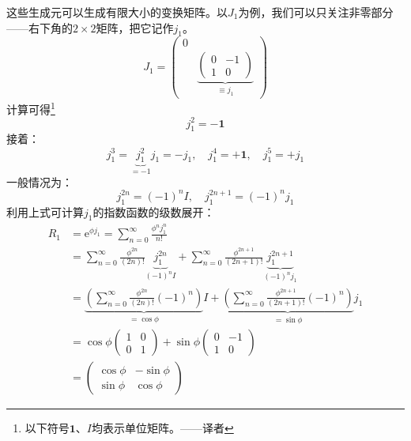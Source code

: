 这些生成元可以生成有限大小的变换矩阵。以$J_1$为例，我们可以只关注非零部分——右下角的$2 \times 2$矩阵，把它记作$j_1$。
\begin{equation}
\label{equ3.65}
J_1 =
	\begin{pmatrix}
		0 & \\
		  &	\underbrace{
		  	\begin{pmatrix}
		  		0 & -1 \\
		  		1 & 0
		  	\end{pmatrix}
		  	}_{\equiv j_1}
	\end{pmatrix}
\end{equation}
计算可得\footnote{以下符号$\mathbf{1}$、$I$均表示单位矩阵。——译者}
\begin{equation}
\label{equ3.66}
j_1^2 = -\mathbf{1}
\end{equation}
接着：
\begin{equation}
\label{equ3.67}
j_1^3 = \underbrace{j_1^2}_{= -1} j_1 = -j_1, \quad j_1^4 = + \mathbf{1}, \quad j_1^5 = +j_1
\end{equation}
一般情况为：
\begin{equation}
\label{equ3.68}
j_1^{2n} = (-1)^n I, \quad j_1^{2n + 1} = (-1)^n j_1
\end{equation}
利用上式可计算$j_1$的指数函数的级数展开：
\begin{align}
R_1 &= \mathrm{e}^{\phi j_1} = \sum_{n = 0}^{\infty} \frac{\phi^n j_1^n}{n!} \nonumber \\
    &= \sum_{n = 0}^{\infty} \frac{\phi^{2n}}{(2n)!} \underbrace{j_1^{2n}}_{(-1)^n I} + \sum_{n = 0}^{\infty} \frac{\phi^{2n + 1}}{ (2n + 1)!} \underbrace{j_1^{2n + 1}}_{(-1)^n j_1} \nonumber \\
    &= \underbrace{\left( \sum_{n = 0}^{\infty} \frac{\phi^{2n}}{(2n)!} (-1)^n  \right)}_{ = \cos \phi} I + \underbrace{\left( \sum_{n = 0}^{\infty} \frac{\phi^{2n + 1}}{(2n + 1)!} (-1)^n  \right)}_{ = \sin \phi} j_1 \nonumber \\
    &= \cos \phi \begin{pmatrix}
    				1 & 0 \\ 0 & 1
    			 \end{pmatrix}
       + \sin \phi 	\begin{pmatrix}
       					0 & -1 \\ 1 & 0
       				\end{pmatrix} \nonumber \\
    &=	\begin{pmatrix}
    		\cos \phi & -\sin \phi \\
    		\sin \phi & \cos \phi
    	\end{pmatrix}
\end{align}
